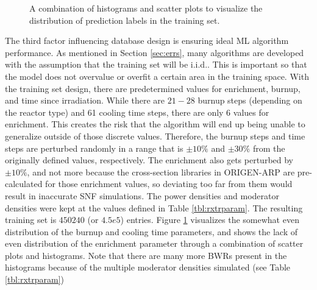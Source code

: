 \begin{figure}[!hbt]
  \caption{A combination of histograms and scatter plots to visualize the 
           distribution of prediction labels in the training set.}
  \label{fig:trainhist}
\end{figure}

The third factor influencing database design is ensuring ideal \gls{ML}
algorithm performance.  As mentioned in Section \ref{sec:errs}, many algorithms
are developed with the assumption that the training set will be
\acrfull{i.i.d.}.  This is important so that the model does not overvalue or
overfit a certain area in the training space. With the training set design,
there are predetermined values for enrichment, burnup, and time since
irradiation.  While there are $21-28$ burnup steps (depending on the reactor
type) and 61 cooling time steps, there are only 6 values for enrichment. This
creates the risk that the algorithm will end up being unable to generalize
outside of those discrete values. Therefore, the burnup steps and time steps
are perturbed randomly in a range that is $\pm10\%$ and $\pm30\%$ from the
originally defined values, respectively.  The enrichment also gets perturbed by
$\pm10\%$, and not more because the cross-section libraries in \gls{ORIGEN-ARP}
are pre-calculated for those enrichment values, so deviating too far from them
would result in inaccurate \gls{SNF} simulations. The power densities and
moderator densities were kept at the values defined in Table
\ref{tbl:rxtrparam}.  The resulting training set is $450240$ (or $4.5e5$)
entries.  Figure \ref{fig:trainhist} visualizes the somewhat even distribution
of the burnup and cooling time parameters, and shows the lack of even
distribution of the enrichment parameter through a combination of scatter plots
and histograms.  Note that there are many more \gls{BWR}s present in the
histograms because of the multiple moderator densities simulated (see Table
\ref{tbl:rxtrparam})

